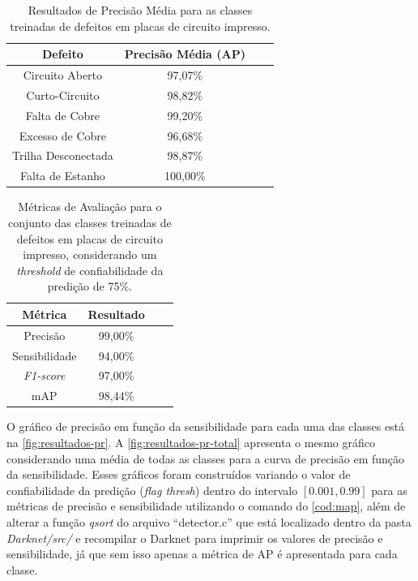 \begin{table}[!h]
  \begin{center}
  \caption{Resultados de Precisão Média para as classes treinadas de defeitos em placas de circuito impresso.}
  \label{tab:resultados-metricas}
  \begin{tabular}{cccc}
    \toprule
    \textbf{Defeito} & \textbf{Precisão Média (AP)} \\
    \midrule \midrule
    Circuito Aberto     & 97,07\% \\
    Curto-Circuito      & 98,82\% \\
    Falta de Cobre      & 99,20\%  \\
    Excesso de Cobre    & 96,68\% \\
    Trilha Desconectada & 98,87\% \\
    Falta de Estanho    & 100,00\% \\
    \bottomrule
  \end{tabular}
  \end{center}
\end{table}

\begin{table}[!h]
  \begin{center}
  \caption{Métricas de Avaliação para o conjunto das classes treinadas de defeitos em placas de circuito impresso, considerando um \textit{threshold} de confiabilidade da predição de 75\%.}
  \label{tab:resultados-metricas-total}
  \begin{tabular}{cccc}
    \toprule
    \textbf{Métrica} & \textbf{Resultado} \\
    \midrule \midrule
    Precisão            & 99,00\% \\
    Sensibilidade       & 94,00\% \\
    \textit{F1-score}   & 97,00\%  \\
    mAP                 & 98,44\% \\
    \bottomrule
  \end{tabular}
  \end{center}
\end{table}

O gráfico de precisão em função da sensibilidade para cada uma das classes está na \autoref{fig:resultados-pr}. A \autoref{fig:resultados-pr-total} apresenta o mesmo gráfico considerando uma média de todas as classes para a curva de precisão em função da sensibilidade.
Esses gráficos foram construídos variando o valor de confiabilidade da predição (\textit{flag thresh}) dentro do intervalo $[0.001, 0.99]$ para as métricas de precisão e sensibilidade utilizando o comando do \autoref{cod:map}, além de alterar a função \textit{qsort} do arquivo ``detector.c'' que está localizado dentro da pasta \textit{Darknet/src/} e recompilar o Darknet para imprimir os valores de precisão e sensibilidade, já que sem isso apenas a métrica de AP é apresentada para cada classe.



